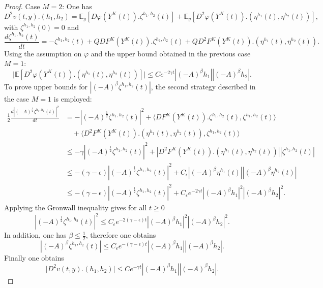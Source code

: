 \documentclass[11pt]{amsart}
\newcommand{\E}{\mathbb{E}}
\begin{document}
\begin{proof}
\noindent
Case $M=2$:
One has
\[
D^2v(t,y).(h_1,h_2)=\E_y[D\varphi(Y^K(t)).\zeta^{h_1,h_2}(t)]+\E_y[D^2\varphi(Y^K(t)).(\eta^{h_1}(t),\eta^{h_2}(t))],
\]
with $\zeta^{h_1,h_2}(0)=0$ and
\[
\frac{d\zeta^{h_1,h_2}(t)}{dt}=-\zeta^{h_1,h_2}(t)+QDF^K(Y^K(t)).\zeta^{h_1,h_2}(t)+QD^2F^K(Y^K(t)).(\eta^{h_1}(t),\eta^{h_2}(t)).
\]
Using the assumption on $\varphi$ and the upper bound obtained in the previous case $M=1$:
\[
\big|\E[D^2\varphi(Y^K(t)).(\eta^{h_1}(t),\eta^{h_2}(t))]\big|\le Ce^{-2\gamma t}|(-A)^{\beta}h_1||(-A)^{\beta}h_2|.
\]
To prove upper bounds for $|(-A)^{\beta}\zeta^{h_1,h_2}(t)|$, the second strategy described in the case $M=1$ is employed:
\begin{align*}
\frac12\frac{d|(-A)^{\frac12}\zeta^{h_1,h_2}(t)|^2}{dt}&=-|(-A)^{\frac12}\zeta^{h_1,h_2}(t)|^2+\langle DF^K(Y^K(t)).\zeta^{h_1,h_2}(t),\zeta^{h_1,h_2}(t)\rangle\\
&\quad+\langle D^2F^K(Y^K(t)).(\eta^{h_1}(t),\eta^{h_2}(t)),\zeta^{h_1,h_2}(t)\rangle\\
&\le -\gamma|(-A)^{\frac12}\zeta^{h_1,h_2}(t)|^2+|D^2F^K(Y^K(t)).(\eta^{h_1}(t),\eta^{h_2}(t))||\zeta^{h_1,h_2}(t)|\\
&\le -(\gamma-\epsilon)|(-A)^{\frac12}\zeta^{h_1,h_2}(t)|^2+C_\epsilon|(-A)^{\beta}\eta^{h_1}(t)||(-A)^{\beta}\eta^{h_2}(t)|\\
&\le -(\gamma-\epsilon)|(-A)^{\frac12}\zeta^{h_1,h_2}(t)|^2+C_\epsilon e^{-2\gamma t}|(-A)^{\beta}h_1|^2|(-A)^{\beta}h_2|^2.
\end{align*}
Applying the Gronwall inequality gives for all $t\ge 0$
\[
|(-A)^{\frac12}\zeta^{h_1,h_2}(t)|^2\le C_\epsilon e^{-2(\gamma-\epsilon)t}|(-A)^{\beta}h_1|^2|(-A)^{\beta}h_2|^2.
\]
In addition, one has $\beta\le \frac12$, therefore one obtains
\[
|(-A)^{\beta}\zeta^{h_1,h_2}(t)|\le C_\epsilon e^{-(\gamma-\epsilon)t}|(-A)^{\beta}h_1||(-A)^{\beta}h_2|.
\]
Finally one obtains
\[
\big|D^2v(t,y).(h_1,h_2)\big|\le Ce^{-\gamma t}|(-A)^{\beta}h_1||(-A)^{\beta}h_2|.
\]
\smallskip


\end{proof}
\end{document}
